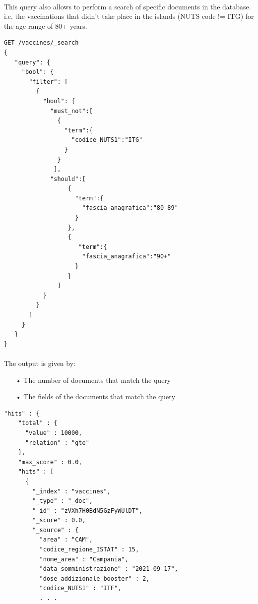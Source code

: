\documentclass[a4paper,12pt]{article}
\begin{document}
\paragraph{} This query also allows to perform a search of specific documents in the database. i.e. the vaccinations that didn't take place in the islands (NUTS code != ITG) for the age range of 80+ years. 
\begin{tcolorbox}[colback=green!5!white,colframe=green!75!black,title=QUERY]
\begin{verbatim}
GET /vaccines/_search
{  
   "query": {
     "bool": {
       "filter": [
         {
           "bool": {
             "must_not":[
               {
                 "term":{
                   "codice_NUTS1":"ITG"
                 }
               }
              ],
             "should":[  
                  {
                    "term":{
                      "fascia_anagrafica":"80-89"
                    }
                  },
                  {  
                     "term":{
                      "fascia_anagrafica":"90+"
                    }
                  }
               ]
           }
         }
       ]
     }
   }
}
\end{verbatim}
\end{tcolorbox}

\paragraph{} The output is given by: 
\begin{itemize}[noitemsep]
\item[•] The number of documents that match the query
\item[•] The fields of the documents that match the query
\end{itemize}

\begin{tcolorbox}[colback=red!5!white,colframe=red!75!black,title=OUTPUT]
\begin{verbatim}
"hits" : {
    "total" : {
      "value" : 10000,
      "relation" : "gte"
    },
    "max_score" : 0.0,
    "hits" : [
      {
        "_index" : "vaccines",
        "_type" : "_doc",
        "_id" : "zVXh7H0BdN5GzFyWUlDT",
        "_score" : 0.0,
        "_source" : {
          "area" : "CAM",
          "codice_regione_ISTAT" : 15,
          "nome_area" : "Campania",
          "data_somministrazione" : "2021-09-17",
          "dose_addizionale_booster" : 2,
          "codice_NUTS1" : "ITF",
          . . .
\end{verbatim}
\end{tcolorbox}
\end{document}
